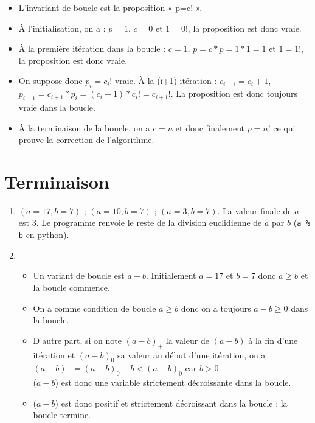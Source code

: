 \begin{itemize}
\item L'invariant de boucle est la proposition « p=c! ».

\item À l'initialisation, on a : $p=1$, $c=0$ et $1=0!$, la proposition est donc vraie.

\item À la première itération dans la boucle : $c=1$, $p=c*p=1*1=1$ et $1=1!$, la proposition est donc vraie.

\item On suppose donc $p_i=c_i!$ vraie. À la (i+1) itération : $c_{i+1}=c_i+1$, $p_{i+1} = c_{i+1}*p_i=(c_i+1)*c_i!=c_{i+1}!$. La proposition est donc toujours vraie dans la boucle.

\item À la terminaison de la boucle, on a $c=n$ et donc finalement $p=n!$ ce qui prouve la correction de l'algorithme.
\end{itemize}

\section{Terminaison}

\begin{enumerate}

\item $(a=17,b=7)$ ; $(a=10,b=7)$ ; $(a=3,b=7)$. La valeur finale de $a$ est 3. Le programme renvoie le reste de la division euclidienne de $a$ par $b$ (\texttt{a \% b} en python).

\item 
\begin{itemize}
\item Un variant de boucle est $a-b$. Initialement $a=17$ et $b=7$ donc $a\geq b$ et la boucle commence.

\item On a comme condition de boucle $a \geq b$ donc on a toujours $a-b \geq0$ dans la boucle.

\item D'autre part, si on note $(a-b)_+$ la valeur de $(a-b)$ à la fin d'une itération et $(a-b)_0$ sa valeur au début d'une itération, on a $(a-b)_+ = (a-b)_0 - b < (a-b)_0$ car $b>0$.\\($a-b$) est donc une variable strictement décroissante dans la boucle.

\item ($a-b$) est donc positif et strictement décroissant dans la boucle : la boucle termine.

\end{itemize}

\end{enumerate}

